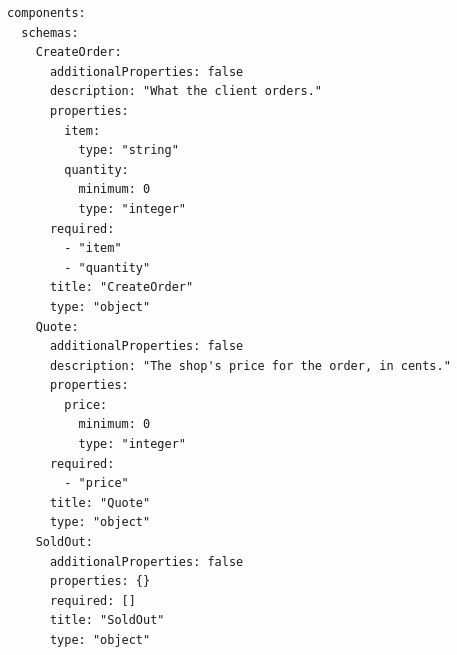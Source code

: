 \begin{lstlisting}[language={},basicstyle=\ttfamily\footnotesize,breaklines=true]
components:
  schemas:
    CreateOrder:
      additionalProperties: false
      description: "What the client orders."
      properties:
        item:
          type: "string"
        quantity:
          minimum: 0
          type: "integer"
      required:
        - "item"
        - "quantity"
      title: "CreateOrder"
      type: "object"
    Quote:
      additionalProperties: false
      description: "The shop's price for the order, in cents."
      properties:
        price:
          minimum: 0
          type: "integer"
      required:
        - "price"
      title: "Quote"
      type: "object"
    SoldOut:
      additionalProperties: false
      properties: {}
      required: []
      title: "SoldOut"
      type: "object"
\end{lstlisting}
